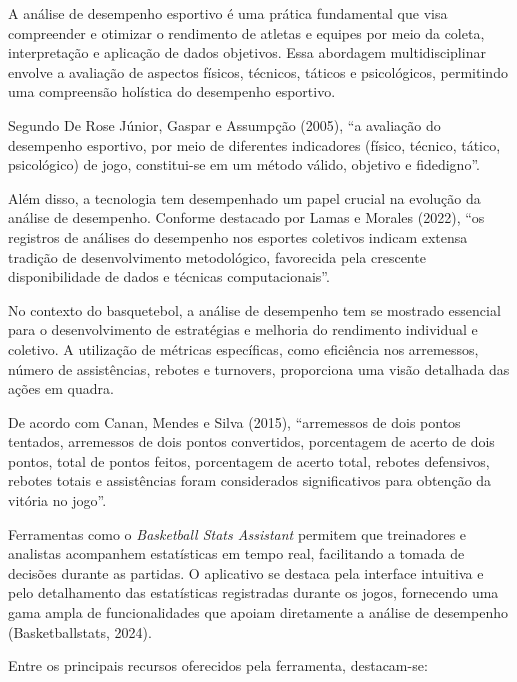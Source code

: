 
A análise de desempenho esportivo é uma prática fundamental que visa compreender e otimizar o rendimento de atletas e equipes por meio da coleta, interpretação e aplicação de dados objetivos. 
Essa abordagem multidisciplinar envolve a avaliação de aspectos físicos, técnicos, táticos e psicológicos, permitindo uma compreensão holística do desempenho esportivo.

Segundo De Rose Júnior, Gaspar e Assumpção (2005), ``a avaliação do desempenho esportivo, por meio de diferentes indicadores (físico, técnico, tático, psicológico) de jogo, constitui-se em um método válido, objetivo e fidedigno''.

Além disso, a tecnologia tem desempenhado um papel crucial na evolução da análise de desempenho. Conforme destacado por Lamas e Morales (2022), 
``os registros de análises do desempenho nos esportes coletivos indicam extensa tradição de desenvolvimento metodológico, favorecida pela crescente disponibilidade de dados e técnicas computacionais''.


No contexto do basquetebol, a análise de desempenho tem se mostrado essencial para o desenvolvimento de estratégias e melhoria do rendimento individual e coletivo. 
A utilização de métricas específicas, como eficiência nos arremessos, número de assistências, rebotes e turnovers, proporciona uma visão detalhada das ações em quadra.

De acordo com Canan, Mendes e Silva (2015), ``arremessos de dois pontos tentados, arremessos de dois pontos convertidos, porcentagem de acerto de dois pontos, 
total de pontos feitos, porcentagem de acerto total, rebotes defensivos, rebotes totais e assistências foram considerados significativos para obtenção da vitória no jogo''.

Ferramentas como o \textit{Basketball Stats Assistant} permitem que treinadores e analistas acompanhem estatísticas em tempo real, facilitando a tomada de decisões durante as partidas. 
O aplicativo se destaca pela interface intuitiva e pelo detalhamento das estatísticas registradas durante os jogos, fornecendo uma gama ampla de funcionalidades que apoiam diretamente a análise de desempenho (Basketballstats, 2024).

Entre os principais recursos oferecidos pela ferramenta, destacam-se:


